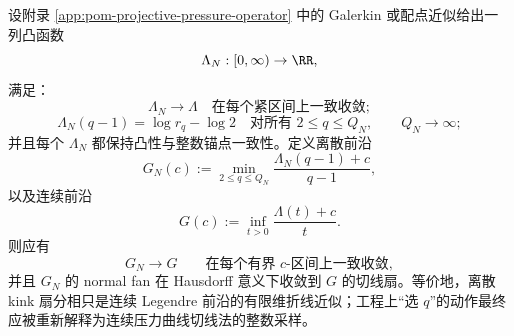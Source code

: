 




\begin{conjecture}\label{conj:conclusion-discrete-kink-normal-fan-hausdorff-to-continuous-legendre}
设附录 \ref{app:pom-projective-pressure-operator} 中的 Galerkin 或配点近似给出一列凸函数
\[
\Lambda_N:[0,\infty)\to\RR,
\]
满足：
\[
\Lambda_N\to\Lambda\quad\text{在每个紧区间上一致收敛};
\]
\[
\Lambda_N(q-1)=\log r_q-\log 2
\quad\text{对所有 }2\le q\le Q_N,\qquad Q_N\to\infty;
\]
并且每个 \(\Lambda_N\) 都保持凸性与整数锚点一致性。定义离散前沿
\[
G_N(c):=\min_{2\le q\le Q_N}\frac{\Lambda_N(q-1)+c}{q-1},
\]
以及连续前沿
\[
G(c):=\inf_{t>0}\frac{\Lambda(t)+c}{t}.
\]
则应有
\[
G_N\to G
\qquad\text{在每个有界 \(c\)-区间上一致收敛},
\]
并且 \(G_N\) 的 normal fan 在 Hausdorff 意义下收敛到 \(G\) 的切线扇。等价地，离散 kink 扇分相只是连续 Legendre 前沿的有限维折线近似；工程上“选 \(q\)”的动作最终应被重新解释为连续压力曲线切线法的整数采样。
\end{conjecture}
